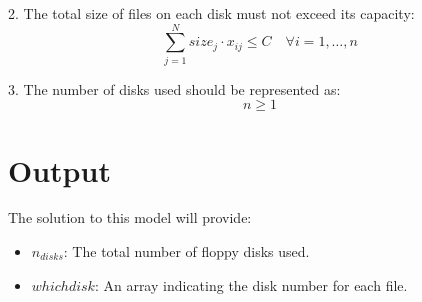 \documentclass{article}
\begin{document}
2. The total size of files on each disk must not exceed its capacity:
\[
\sum_{j=1}^{N} size_j \cdot x_{ij} \leq C \quad \forall i = 1, \ldots, n
\]

3. The number of disks used should be represented as:
\[
n \geq 1
\]

\section*{Output}
The solution to this model will provide:
\begin{itemize}
    \item \( n_{disks} \): The total number of floppy disks used.
    \item \( whichdisk \): An array indicating the disk number for each file.
\end{itemize}
\end{document}
